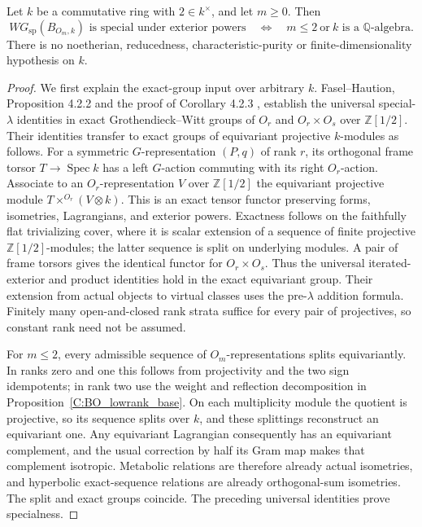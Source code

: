 \begin{theorem}
\label{C:BO_affine_lambda}
Let $k$ be a commutative ring with $2\in k^\times$, and let $m\geq0$.
Then
\[
 WG_{\mathrm{sp}}(B_{O_m,k})\text{ is special under exterior powers}
 \quad\Longleftrightarrow\quad
       m\leq2\ \text{or}\ k\text{ is a }\mathbb Q\text{-algebra}.       \tag{C.3.15}
\]
There is no noetherian, reducedness, characteristic-purity or
finite-dimensionality hypothesis on $k$.
\end{theorem}
\begin{proof}
We first explain the exact-group input over arbitrary $k$.
Fasel--Haution, Proposition 4.2.2 and the proof of Corollary 4.2.3
\cite{C-FaselHaution2025}, establish the universal special-$\lambda$
identities in exact Grothendieck--Witt groups of $O_r$ and
$O_r\times O_s$ over $\mathbb Z[1/2]$. Their identities transfer to
exact groups of equivariant projective $k$-modules as follows.
For a symmetric $G$-representation $(P,q)$ of rank $r$, its orthogonal
frame torsor $T\to\operatorname{Spec}k$ has a left $G$-action commuting
with its right $O_r$-action. Associate to an $O_r$-representation $V$
over $\mathbb Z[1/2]$ the equivariant projective module
$T\times^{O_r}(V\otimes k)$. This is an exact tensor functor preserving
forms, isometries, Lagrangians, and exterior powers. Exactness follows
on the faithfully flat trivializing cover, where it is scalar extension
of a sequence of finite projective $\mathbb Z[1/2]$-modules; the latter
sequence is split on underlying modules. A pair of frame torsors gives
the identical functor for $O_r\times O_s$.
Thus the universal iterated-exterior and product identities hold in
the exact equivariant group. Their extension from actual objects to
virtual classes uses the pre-$\lambda$ addition formula. Finitely many
open-and-closed rank strata suffice for every pair of projectives, so
constant rank need not be assumed.

For $m\leq2$, every admissible sequence of $O_m$-representations
splits equivariantly. In ranks zero and one this follows from
projectivity and the two sign idempotents; in rank two use the weight
and reflection decomposition in Proposition~\ref{C:BO_lowrank_base}.
On each multiplicity module the quotient is projective, so its sequence
splits over $k$, and these splittings reconstruct an equivariant one.
Any equivariant Lagrangian consequently has an equivariant complement,
and the usual correction by half its Gram map makes that complement
isotropic. Metabolic relations are therefore already actual isometries,
and hyperbolic exact-sequence relations are already orthogonal-sum
isometries. The split and exact groups coincide. The preceding
universal identities prove specialness.


\end{proof}

